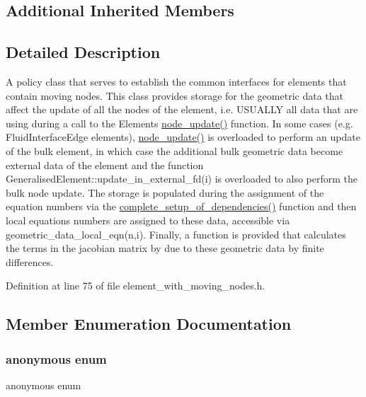 \subsection*{Additional Inherited Members}


\subsection{Detailed Description}
A policy class that serves to establish the common interfaces for elements that contain moving nodes. This class provides storage for the geometric data that affect the update of all the nodes of the element, i.\+e. U\+S\+U\+A\+L\+LY all data that are using during a call to the Element\textquotesingle{}s \hyperlink{classoomph_1_1FiniteElement_ac27d707cb4f7c1429793c0fdb2fd093b}{node\+\_\+update()} function. In some cases (e.\+g. Fluid\+Interface\+Edge elements), \hyperlink{classoomph_1_1FiniteElement_ac27d707cb4f7c1429793c0fdb2fd093b}{node\+\_\+update()} is overloaded to perform an update of the bulk element, in which case the additional bulk geometric data become external data of the element and the function Generalised\+Element\+::update\+\_\+in\+\_\+external\+\_\+fd(i) is overloaded to also perform the bulk node update. The storage is populated during the assignment of the equation numbers via the \hyperlink{classoomph_1_1ElementWithMovingNodes_a6d2fa178f36d4b8413a9ce4f24e9c87e}{complete\+\_\+setup\+\_\+of\+\_\+dependencies()} function and then local equations numbers are assigned to these data, accessible via geometric\+\_\+data\+\_\+local\+\_\+eqn(n,i). Finally, a function is provided that calculates the terms in the jacobian matrix by due to these geometric data by finite differences. 

Definition at line 75 of file element\+\_\+with\+\_\+moving\+\_\+nodes.\+h.



\subsection{Member Enumeration Documentation}
\mbox{\label{classoomph_1_1ElementWithMovingNodes_a95a2aba98758542cd165867776c9ff4f}} 
\subsubsection{\texorpdfstring{anonymous enum}{anonymous enum}}
{\footnotesize\ttfamily anonymous enum}



